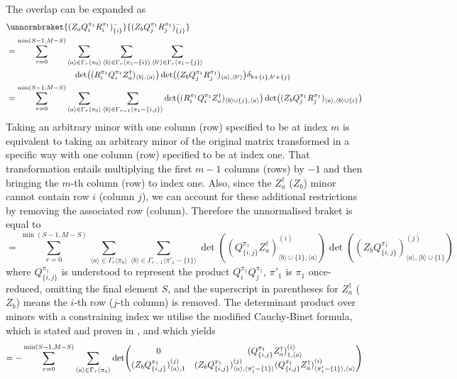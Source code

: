 \documentclass[12pt]{article}
\newcommand{\seq}[1]{\langle #1\rangle}
\newcommand{\hc}{^\dagger}
\begin{document}
	The overlap can be expanded as
	\begin{align*}
	&\unnormbraket{(Z_aQ^{\pi_1}_iR^{\pi_1}_i)^{-}_{\{i\}}}{(Z_bQ^{\pi_1}_jR^{\pi_1}_j)^{-}_{\{j\}}}\\
	&=\sum_{r=0}^{\min(S-1,M-S)}\sum_{\seq{a}\in\Gamma_r\seq{\pi_0}}\sum_{\seq{b}\in\Gamma_r\seq{\pi_1-\{i\}}}\sum_{\seq{b'}\in\Gamma_r\seq{\pi_1-\{j\}}}\\
	&\qquad\qquad\qquad\qquad\det((R^{\pi_1}_iQ^{\pi_1}_iZ_a\hc)_{\seq{b}, \seq{a}})\det((Z_bQ^{\pi_1}_jR^{\pi_1}_j)_{\seq{a},\seq{b'}})\delta_{b+\{i\},b'+\{j\}}\\
	&=\sum_{r=0}^{\min(S-1,M-S)}\sum_{\seq{a}\in\Gamma_r\seq{\pi_0}}\sum_{\seq{b}\in\Gamma_{r-1}\seq{\pi_1-\{i, j\}}}\det((R^{\pi_1}_iQ^{\pi_1}_iZ_a\hc)_{\seq{b}\cup \{j\}, \seq{a}})\det((Z_bQ^{\pi_1}_jR^{\pi_1}_j)_{\seq{a},\seq{b}\cup \{i\}})
	\end{align*}
	Taking an arbitrary minor with one column (row) specified to be at index $m$ is equivalent to taking an arbitrary minor of the original matrix transformed in a specific way with one column (row) specified to be at index one. That transformation entails multiplying the first $m-1$ columns (rows) by $-1$ and then bringing the $m$-th column (row) to index one. Also, since the $Z_a\hc$ ($Z_b$) minor cannot contain row $i$ (column $j$), we can account for these additional restrictions by removing the associated row (column). Therefore the unnormalised braket is equal to
	\begin{equation}
	=\sum_{r=0}^{\min(S-1,M-S)}\sum_{\seq{a}\in\Gamma_r\seq{\pi_0}}\sum_{\seq{b}\in\Gamma_{r-1}\seq{\pi'_1-\{1\}}}\det((Q^{\pi_1}_{\{i,j\}}Z_a\hc)^{(i)}_{\seq{b}\cup \{1\}, \seq{a}})\det((Z_bQ^{\pi_1}_{\{i,j\}})^{(j)}_{\seq{a},\seq{b}\cup \{1\}})
	\end{equation}
	where $Q^{\pi_1}_{\{i,j\}}$ is understood to represent the product $Q^{\pi_1}_iQ^{\pi_1}_j$, $\pi'_1$ is $\pi_1$ once-reduced, omitting the final element $S$, and the superscript in parentheses for $Z_a\hc$ ($Z_b$) means the $i$-th row ($j$-th column) is removed. The determinant product over minors with a constraining index we utilise the modified Cauchy-Binet formula, which is stated and proven in \cite[App. C]{modified_cauchy_binet}, and which yields
	\begin{equation}
	=-\sum_{r=0}^{\min(S-1,M-S)}\sum_{\seq{a}\in\Gamma_r\seq{\pi_0}}\det(\mqty{
		0 & (Q^{\pi_1}_{\{i,j\}}Z_a\hc)^{(i)}_{1, \seq{a}}\\
		(Z_bQ^{\pi_1}_{\{i,j\}})^{(j)}_{\seq{a},1} & (Z_bQ^{\pi_1}_{\{i,j\}})^{(j)}_{\seq{a},\seq{\pi'_1-\{1\}}} (Q^{\pi_1}_{\{i,j\}}Z_a\hc)^{(i)}_{\seq{\pi'_1-\{1\}}, \seq{a}}
	})
	\end{equation}
	
\end{document}

